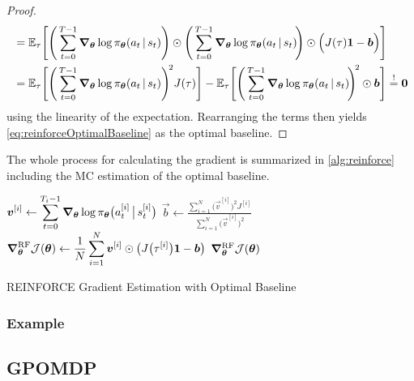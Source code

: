 \begin{proof}
\begin{align}
						&= \mathbb{E}_\tau\Biggl[ \Biggl(\, \sum_{t = 0}^{T - 1} \grad_{\bm{\theta}} \log \pi_{\bm{\theta}}(a_t \,\vert\, s_t) \Biggr) \odot \Biggl(\, \sum_{t = 0}^{T - 1} \grad_{\bm{\theta}} \log \pi_{\bm{\theta}}(a_t \,\vert\, s_t) \!\Biggr) \odot \Bigl( J(\tau) \bm{1} - \bm{b} \Bigr) \Biggr] \\
						&= \mathbb{E}_\tau\Biggl[ \Biggl(\, \sum_{t = 0}^{T - 1} \grad_{\bm{\theta}} \log \pi_{\bm{\theta}}(a_t \,\vert\, s_t) \Biggr)^{\!2} J(\tau) \Biggr] - \mathbb{E}_\tau\Biggl[ \Biggl(\, \sum_{t = 0}^{T - 1} \grad_{\bm{\theta}} \log \pi_{\bm{\theta}}(a_t \,\vert\, s_t) \!\Biggr)^{\!2} \odot \bm{b} \Biggr]
						 \overset{!}{=} \bm{0}
				\end{align}
				using the linearity of the expectation. Rearranging the terms then yields \eqref{eq:reinforceOptimalBaseline} as the optimal baseline.
			\end{proof}

			The whole process for calculating the gradient is summarized in \autoref{alg:reinforce} including the \ac{MC} estimation of the optimal baseline.

			\begin{algorithm}  \DontPrintSemicolon
				\(\displaystyle \bm{v}^{[i]} \gets \sum_{t = 0}^{T_i - 1} \grad_{\bm{\theta}} \log \pi_{\bm{\theta}}\bigl( a_t^{[i]} \,\big\vert\, s_t^{[i]} \bigr) \) \;
				\(\displaystyle \vec{b} \gets \frac{\sum_{i = 1}^{N} \bigl(\vec{v}^{[i]}\bigr)^2 J^{[i]}}{\sum_{i = 1}^{N} \bigl(\vec{v}^{[i]}\bigr)^2} \)  \quad{}
				\(\displaystyle \grad_{\bm{\theta}}^\mathrm{RF} \mathcal{J}(\bm{\theta}) \gets \frac{1}{N} \sum_{i = 1}^{N} \bm{v}^{[i]} \odot \bigl( J\bigl(\tau^{[i]}\bigr) \bm{1} - \bm{b} \bigr) \)  \quad{}
				\Return \( \grad_{\bm{\theta}}^\mathrm{RF} \mathcal{J}(\bm{\theta}) \) \;
				\caption{REINFORCE Gradient Estimation with Optimal Baseline}
				\label{alg:reinforce}
			\end{algorithm}

			\subsubsection{Example}

		\subsection{\acs{GPOMDP}}
		 \label{subsec:gpomdp}

